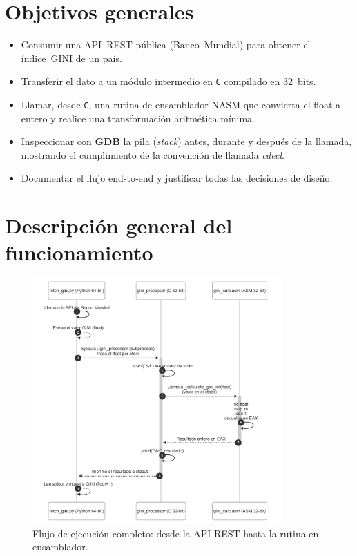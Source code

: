 \documentclass[a4paper,12pt]{article}
\begin{document}

\tableofcontents
\newpage

\section{Objetivos generales}
\begin{itemize}[leftmargin=*]
  \item Consumir una API REST pública (Banco Mundial) para obtener el índice GINI de un país.
  \item Transferir el dato a un módulo intermedio en \texttt{C} compilado en 32 bits.
  \item Llamar, desde \texttt{C}, una rutina de ensamblador NASM que convierta el float a entero y realice una transformación aritmética mínima.
  \item Inspeccionar con \textbf{GDB} la pila (\emph{stack}) antes, durante y después de la llamada, mostrando el cumplimiento de la convención de llamada \emph{cdecl}.
  \item Documentar el flujo end‑to‑end y justificar todas las decisiones de diseño.
\end{itemize}

\newpage

\section{Descripción general del funcionamiento}
\begin{figure}[H]
  \centering
  \includegraphics[width=0.85\textwidth]{images/diagram.png}
  \caption{Flujo de ejecución completo: desde la API REST hasta la rutina en ensamblador.}\label{fig:sequence}
\end{figure}
\end{document}
